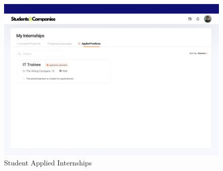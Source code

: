 \documentclass{article}
\begin{document}
\begin{figure}[H]
    \centering
    \includegraphics[scale = 0.42]{figures/UserInterfaces/Student/AppliedPositions.png}
    \caption{Student Applied Internships}
     \centering
\end{figure}
\end{document}
